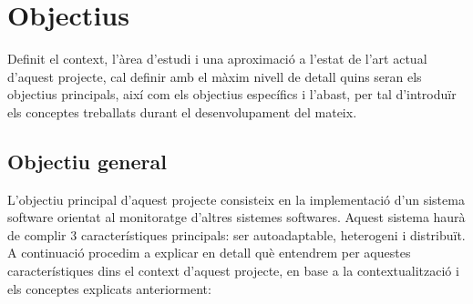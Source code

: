 
\chapter{Objectius} %

\label{Objectius} %


Definit el context, l'àrea d'estudi i una aproximació a l'estat de l'art actual d'aquest projecte, cal definir amb el màxim nivell de detall quins seran els objectius principals, així com els objectius específics i l'abast, per tal d'introduïr els conceptes treballats durant el desenvolupament del mateix.

\section{Objectiu general}

L’objectiu principal d’aquest projecte consisteix en la implementació d’un sistema software orientat al monitoratge d’altres sistemes softwares. Aquest sistema haurà de complir 3 característiques principals: ser autoadaptable, heterogeni i distribuït. A continuació procedim a explicar en detall què entendrem per aquestes característiques dins el context d’aquest projecte, en base a la contextualització i els conceptes explicats anteriorment:

